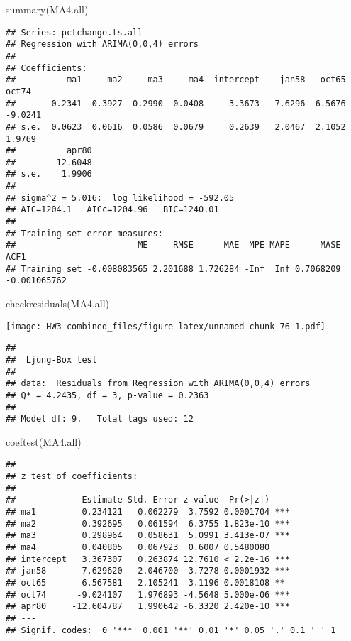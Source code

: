 \documentclass[
]{article}
\newenvironment{Shaded}{\begin{snugshade}}{\end{snugshade}}
\newcommand{\FunctionTok}[1]{\textcolor[rgb]{0.00,0.00,0.00}{#1}}
\newcommand{\NormalTok}[1]{#1}
\begin{document}
\begin{Shaded}
\begin{Highlighting}[]
\FunctionTok{summary}\NormalTok{(MA4.all)}
\end{Highlighting}
\end{Shaded}

\begin{verbatim}
## Series: pctchange.ts.all 
## Regression with ARIMA(0,0,4) errors 
## 
## Coefficients:
##          ma1     ma2     ma3     ma4  intercept    jan58   oct65    oct74
##       0.2341  0.3927  0.2990  0.0408     3.3673  -7.6296  6.5676  -9.0241
## s.e.  0.0623  0.0616  0.0586  0.0679     0.2639   2.0467  2.1052   1.9769
##          apr80
##       -12.6048
## s.e.    1.9906
## 
## sigma^2 = 5.016:  log likelihood = -592.05
## AIC=1204.1   AICc=1204.96   BIC=1240.01
## 
## Training set error measures:
##                        ME     RMSE      MAE  MPE MAPE      MASE         ACF1
## Training set -0.008083565 2.201688 1.726284 -Inf  Inf 0.7068209 -0.001065762
\end{verbatim}

\begin{Shaded}
\begin{Highlighting}[]
\FunctionTok{checkresiduals}\NormalTok{(MA4.all)}
\end{Highlighting}
\end{Shaded}

\texttt{[image: HW3-combined\_files/figure-latex/unnamed-chunk-76-1.pdf]}

\begin{verbatim}
## 
##  Ljung-Box test
## 
## data:  Residuals from Regression with ARIMA(0,0,4) errors
## Q* = 4.2435, df = 3, p-value = 0.2363
## 
## Model df: 9.   Total lags used: 12
\end{verbatim}

\begin{Shaded}
\begin{Highlighting}[]
\FunctionTok{coeftest}\NormalTok{(MA4.all)}
\end{Highlighting}
\end{Shaded}

\begin{verbatim}
## 
## z test of coefficients:
## 
##             Estimate Std. Error z value  Pr(>|z|)    
## ma1         0.234121   0.062279  3.7592 0.0001704 ***
## ma2         0.392695   0.061594  6.3755 1.823e-10 ***
## ma3         0.298964   0.058631  5.0991 3.413e-07 ***
## ma4         0.040805   0.067923  0.6007 0.5480080    
## intercept   3.367307   0.263874 12.7610 < 2.2e-16 ***
## jan58      -7.629620   2.046700 -3.7278 0.0001932 ***
## oct65       6.567581   2.105241  3.1196 0.0018108 ** 
## oct74      -9.024107   1.976893 -4.5648 5.000e-06 ***
## apr80     -12.604787   1.990642 -6.3320 2.420e-10 ***
## ---
## Signif. codes:  0 '***' 0.001 '**' 0.01 '*' 0.05 '.' 0.1 ' ' 1
\end{verbatim}
\end{document}
